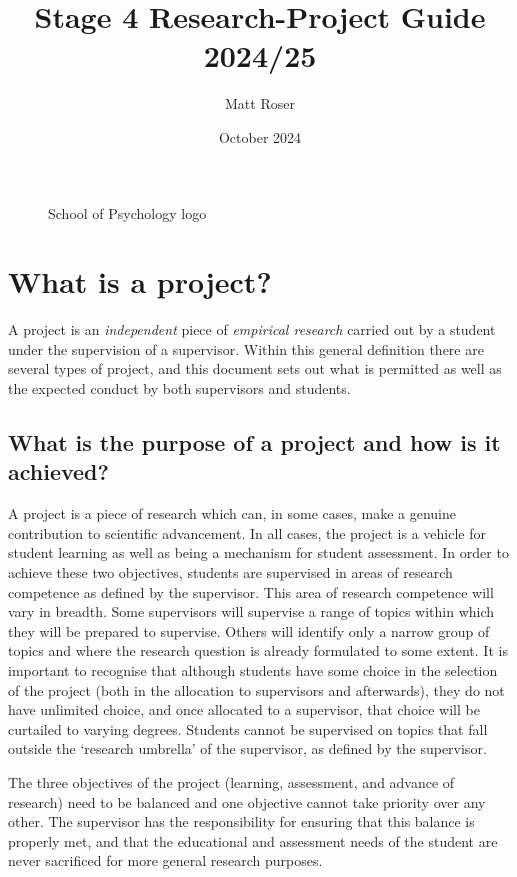 \documentclass[
]{book}
\title{Stage 4 Research-Project Guide 2024/25}
\author{Matt Roser}
\date{October 2024}
\begin{document}
\maketitle

{
\setcounter{tocdepth}{1}
\tableofcontents
}
\begin{figure}
\centering
\caption{School of Psychology logo}
\end{figure}

\chapter{What is a project?}\label{what-is-a-project}

A project is an \emph{independent} piece of \emph{empirical research} carried out by a student under the supervision of a supervisor. Within this general definition there are several types of project, and this document sets out what is permitted as well as the expected conduct by both supervisors and students.

\section{What is the purpose of a project and how is it achieved?}\label{what-is-the-purpose-of-a-project-and-how-is-it-achieved}

A project is a piece of research which can, in some cases, make a genuine contribution to scientific advancement. In all cases, the project is a vehicle for student learning as well as being a mechanism for student assessment. In order to achieve these two objectives, students are supervised in areas of research competence as defined by the supervisor. This area of research competence will vary in breadth. Some supervisors will supervise a range of topics within which they will be prepared to supervise. Others will identify only a narrow group of topics and where the research question is already formulated to some extent. It is important to recognise that although students have some choice in the selection of the project (both in the allocation to supervisors and afterwards), they do not have unlimited choice, and once allocated to a supervisor, that choice will be curtailed to varying degrees. Students cannot be supervised on topics that fall outside the `research umbrella' of the supervisor, as defined by the supervisor.

The three objectives of the project (learning, assessment, and advance of research) need to be balanced and one objective cannot take priority over any other. The supervisor has the responsibility for ensuring that this balance is properly met, and that the educational and assessment needs of the student are never sacrificed for more general research purposes.
\end{document}
